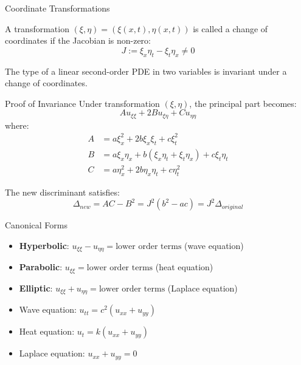 \documentclass{beamer}
\begin{document}
\begin{frame}{Coordinate Transformations}
    \begin{definition}
        A transformation $(\xi, \eta) = (\xi(x,t), \eta(x,t))$ is called a change of coordinates if the Jacobian is non-zero:
        \[
        J := \xi_x \eta_t - \xi_t \eta_x \neq 0
        \]
    \end{definition}
    
    \begin{theorem}
        The type of a linear second-order PDE in two variables is invariant under a change of coordinates.
    \end{theorem}
\end{frame}

\begin{frame}{Proof of Invariance}
    Under transformation $(\xi, \eta)$, the principal part becomes:
    \[
    A u_{\xi\xi} + 2B u_{\xi\eta} + C u_{\eta\eta}
    \]
    where:
    \[
    \begin{aligned}
        A &= a \xi_x^2 + 2b \xi_x \xi_t + c \xi_t^2 \\
        B &= a \xi_x \eta_x + b (\xi_x \eta_t + \xi_t \eta_x) + c \xi_t \eta_t \\
        C &= a \eta_x^2 + 2b \eta_x \eta_t + c \eta_t^2
    \end{aligned}
    \]
    
    The new discriminant satisfies:
    \[
    \Delta_{new} = AC - B^2 = J^2 (b^2 - ac) = J^2 \Delta_{original}
    \]
\end{frame}

\begin{frame}{Canonical Forms}
    \begin{itemize}
        \item \textbf{Hyperbolic}: $u_{\xi\xi} - u_{\eta\eta} = \text{lower order terms}$ (wave equation)
        \item \textbf{Parabolic}: $u_{\xi\xi} = \text{lower order terms}$ (heat equation)
        \item \textbf{Elliptic}: $u_{\xi\xi} + u_{\eta\eta} = \text{lower order terms}$ (Laplace equation)
    \end{itemize}
    
    \begin{examples}
        \begin{itemize}
            \item Wave equation: $u_{tt} = c^2(u_{xx} + u_{yy})$
            \item Heat equation: $u_t = k(u_{xx} + u_{yy})$
            \item Laplace equation: $u_{xx} + u_{yy} = 0$
        \end{itemize}
    \end{examples}
\end{frame}
\end{document}
